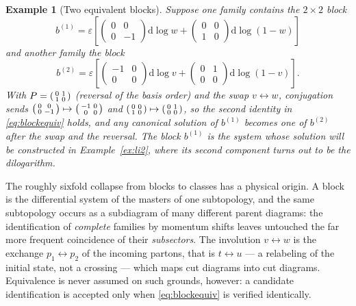 \documentclass[11pt]{article}
\newcommand{\eps}{\varepsilon}
\newcommand{\dd}{\mathrm{d}}
\newtheorem{example}[definition]{Example}
\begin{document}
\begin{example}[Two equivalent blocks]
\label{ex:blockequiv}
Suppose one family contains the $2\times2$ block
\begin{equation}
  b^{(1)} = \eps\left[
  \begin{pmatrix} 0 & 0\\ 0 & -1\end{pmatrix}\dd\log w
  +
  \begin{pmatrix} 0 & 0\\ 1 & 0 \end{pmatrix}\dd\log(1-w)
  \right]
\end{equation}
and another family the block
\begin{equation}
  b^{(2)} = \eps\left[
  \begin{pmatrix} -1 & 0\\ 0 & 0\end{pmatrix}\dd\log v
  +
  \begin{pmatrix} 0 & 1\\ 0 & 0 \end{pmatrix}\dd\log(1-v)
  \right] .
\end{equation}
With $P = \begin{psmallmatrix} 0 & 1\\ 1 & 0\end{psmallmatrix}$
(reversal of the basis order) and the swap $v \leftrightarrow w$,
conjugation sends
$\begin{psmallmatrix} 0 & 0\\ 0 & -1\end{psmallmatrix} \mapsto
 \begin{psmallmatrix} -1 & 0\\ 0 & 0\end{psmallmatrix}$ and
$\begin{psmallmatrix} 0 & 0\\ 1 & 0\end{psmallmatrix} \mapsto
 \begin{psmallmatrix} 0 & 1\\ 0 & 0\end{psmallmatrix}$,
so the second identity in \eqref{eq:blockequiv} holds, and any
canonical solution of $b^{(1)}$ becomes one of $b^{(2)}$ after the
swap and the reversal.  The block $b^{(1)}$ is the system whose
solution
will be constructed in Example~\ref{ex:li2}, where its second
component turns out to be the dilogarithm.
\end{example}

The roughly sixfold collapse from blocks to classes has a physical
origin.  A block is the differential system of the masters of one
subtopology, and the same subtopology occurs as a subdiagram of
many different parent diagrams: the identification of
\emph{complete} families by momentum shifts leaves untouched the far
more frequent coincidence of their \emph{subsectors}.  The
involution $v \leftrightarrow w$ is the exchange
$p_1 \leftrightarrow p_2$ of the incoming partons, that is
$t \leftrightarrow u$ --- a relabeling of the initial state, not a
crossing --- which maps cut diagrams into cut diagrams.  Equivalence
is never assumed on such grounds, however: a candidate identification
is accepted only when \eqref{eq:blockequiv} is verified identically.
\end{document}
